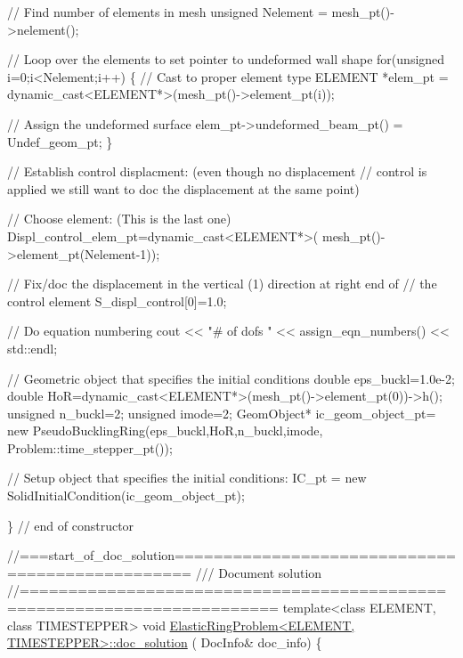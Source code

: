\begin{DoxyCodeInclude}
 \textcolor{comment}{// Find number of elements in mesh}
 \textcolor{keywordtype}{unsigned} Nelement = mesh\_pt()->nelement();

 \textcolor{comment}{// Loop over the elements to set pointer to undeformed wall shape}
 \textcolor{keywordflow}{for}(\textcolor{keywordtype}{unsigned} i=0;i<Nelement;i++)
  \{
   \textcolor{comment}{// Cast to proper element type}
   ELEMENT *elem\_pt = \textcolor{keyword}{dynamic\_cast<}ELEMENT*\textcolor{keyword}{>}(mesh\_pt()->element\_pt(i));

   \textcolor{comment}{// Assign the undeformed surface}
   elem\_pt->undeformed\_beam\_pt() = Undef\_geom\_pt;
  \}

 \textcolor{comment}{// Establish control displacment: (even though no displacement }
 \textcolor{comment}{// control is applied we still want to doc the displacement at the same point)}

 \textcolor{comment}{// Choose element: (This is the last one)}
 Displ\_control\_elem\_pt=\textcolor{keyword}{dynamic\_cast<}ELEMENT*\textcolor{keyword}{>}(
  mesh\_pt()->element\_pt(Nelement-1));
 
 \textcolor{comment}{// Fix/doc the displacement in the vertical (1) direction at right end of}
 \textcolor{comment}{// the control element}
 S\_displ\_control[0]=1.0;
 
 \textcolor{comment}{// Do equation numbering}
 cout << \textcolor{stringliteral}{"# of dofs "} << assign\_eqn\_numbers() << std::endl;

 \textcolor{comment}{// Geometric object that specifies the initial conditions}
 \textcolor{keywordtype}{double} eps\_buckl=1.0e-2;
 \textcolor{keywordtype}{double} HoR=\textcolor{keyword}{dynamic\_cast<}ELEMENT*\textcolor{keyword}{>}(mesh\_pt()->element\_pt(0))->h();
 \textcolor{keywordtype}{unsigned} n\_buckl=2;
 \textcolor{keywordtype}{unsigned} imode=2;
 GeomObject* ic\_geom\_object\_pt=
  \textcolor{keyword}{new} PseudoBucklingRing(eps\_buckl,HoR,n\_buckl,imode,
                         Problem::time\_stepper\_pt()); 
 
 \textcolor{comment}{// Setup object that specifies the initial conditions:}
 IC\_pt = \textcolor{keyword}{new} SolidInitialCondition(ic\_geom\_object\_pt);
 
\} \textcolor{comment}{// end of constructor}


\textcolor{comment}{//===start\_of\_doc\_solution================================================}\textcolor{comment}{}
\textcolor{comment}{/// Document solution}
\textcolor{comment}{}\textcolor{comment}{//========================================================================}
\textcolor{keyword}{template}<\textcolor{keyword}{class} ELEMENT, \textcolor{keyword}{class} TIMESTEPPER>
\textcolor{keywordtype}{void} \hyperlink{classElasticRingProblem_a9aa904e4cf82d45711f890cd8440ced9}{ElasticRingProblem<ELEMENT, TIMESTEPPER>::doc\_solution}
      (
 DocInfo& doc\_info)
\{ 


\end{DoxyCodeInclude}
